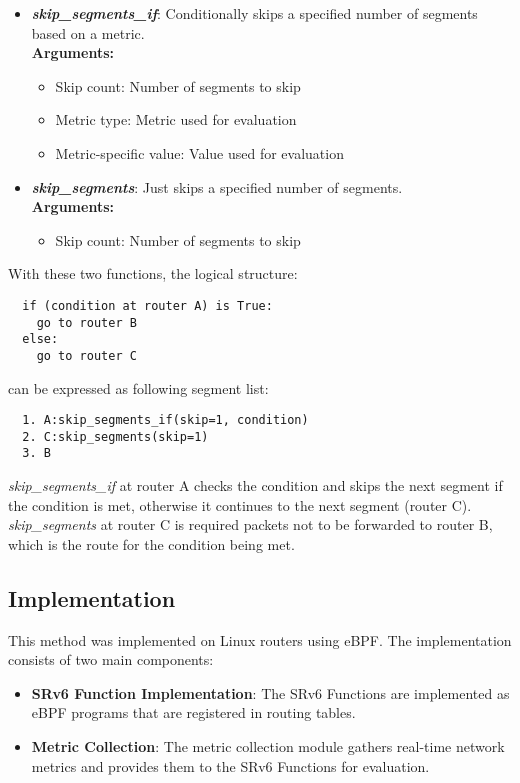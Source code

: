 \documentclass[conference]{IEEEtran}
\begin{document}
\begin{itemize}
  \item \textbf{\textit{skip\_segments\_if}}: Conditionally skips a specified number of segments based on a metric. \\
        \textbf{Arguments:}
        \begin{itemize}
          \item Skip count: Number of segments to skip
          \item Metric type: Metric used for evaluation
          \item Metric-specific value: Value used for evaluation
        \end{itemize}

  \item \textbf{\textit{skip\_segments}}: Just skips a specified number of segments. \\
        \textbf{Arguments:}
        \begin{itemize}
          \item Skip count: Number of segments to skip
        \end{itemize}
\end{itemize}

With these two functions, the logical structure:
\begin{verbatim}
  if (condition at router A) is True:
    go to router B
  else:
    go to router C
\end{verbatim}

can be expressed as following segment list:

\begin{verbatim}
  1. A:skip_segments_if(skip=1, condition)
  2. C:skip_segments(skip=1)
  3. B
\end{verbatim}

\textit{skip\_segments\_if} at router A checks the condition and skips the next segment if the condition is met, otherwise it continues to the next segment (router C).
\textit{skip\_segments} at router C is required packets not to be forwarded to router B, which is the route for the condition being met.

\subsection{Implementation}

This method was implemented on Linux routers using eBPF.
The implementation consists of two main components:
\begin{itemize}
  \item \textbf{SRv6 Function Implementation}: The SRv6 Functions are implemented as eBPF programs that are registered in routing tables.
  \item \textbf{Metric Collection}: The metric collection module gathers real-time network metrics and provides them to the SRv6 Functions for evaluation.
\end{itemize}
\end{document}
